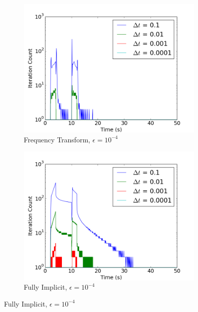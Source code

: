\documentclass[12pt]{report}
\begin{document}
\begin{figure}[ht]
			\begin{subfigure}{.5\textwidth}
				\centering
				\includegraphics[width=.95\linewidth]{figs/iter_case1_conv2.png}
				\caption{Frequency Transform, $\epsilon = 10^{-4}$}
				\label{fig::iter_1_2_ft}
			\end{subfigure}%
			\begin{subfigure}{.5\textwidth}
				\centering
				\includegraphics[width=.95\linewidth]{figs/iter_case1_conv2_omega0.png}
				\caption{Fully Implicit, $\epsilon = 10^{-4}$}
				\label{fig::iter_1_2_fi}
			\end{subfigure}
			

\end{figure}
\end{document}
